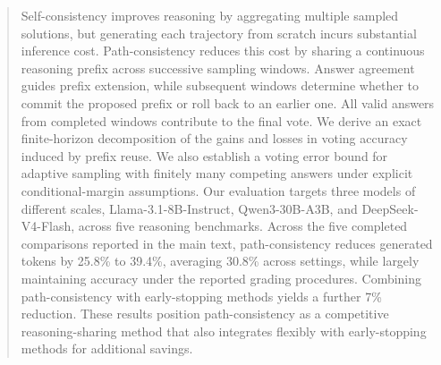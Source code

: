 \begin{abstract}
Self-consistency improves reasoning by aggregating multiple sampled solutions, but generating each trajectory from scratch incurs substantial inference cost. Path-consistency reduces this cost by sharing a continuous reasoning prefix across successive sampling windows. Answer agreement guides prefix extension, while subsequent windows determine whether to commit the proposed prefix or roll back to an earlier one. All valid answers from completed windows contribute to the final vote. We derive an exact finite-horizon decomposition of the gains and losses in voting accuracy induced by prefix reuse. We also establish a voting error bound for adaptive sampling with finitely many competing answers under explicit conditional-margin assumptions. Our evaluation targets three models of different scales, Llama-3.1-8B-Instruct, Qwen3-30B-A3B, and DeepSeek-V4-Flash, across five reasoning benchmarks. Across the five completed comparisons reported in the main text, path-consistency reduces generated tokens by 25.8\% to 39.4\%, averaging 30.8\% across settings, while largely maintaining accuracy under the reported grading procedures. Combining path-consistency with early-stopping methods yields a further 7\% reduction. These results position path-consistency as a competitive reasoning-sharing method that also integrates flexibly with early-stopping methods for additional savings.
\end{abstract}
